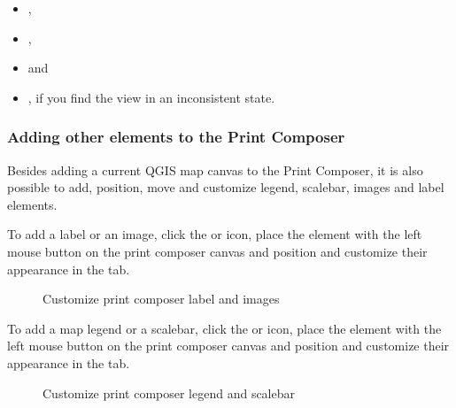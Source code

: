 \begin{itemize}
\item {},
\item {},
\item {} and
\item {}, if you find the view in an
inconsistent state.
\end{itemize}


\subsubsection{Adding other elements to the Print Composer} 

Besides adding a current QGIS map canvas to the Print Composer, it is also possible 
to add, position, move and customize legend, scalebar, images and label elements.


To add a label or an image, click the  or 
 icon, place the element with
the left mouse button on the print composer canvas and position and customize
their appearance in the  tab. 

\begin{figure}[ht]
\centering
\caption{Customize print composer label and images \nixcaption}\label{fig:print_composer_tab2}
   \goodgap
\end{figure}


To add a map legend or a scalebar, click the  or 
 icon, place the element with the left 
mouse button on the print composer canvas and position and customize their appearance in the  tab.

\begin{figure}[ht]
\centering
\caption{Customize print composer legend and scalebar \nixcaption}\label{fig:print_composer_tab1}
   \goodgap
\end{figure}

